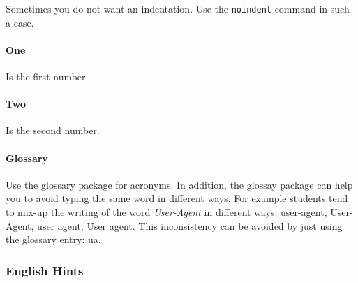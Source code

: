 \noindent Sometimes you do not want an indentation. Use the \texttt{noindent} command in such a case.
\paragraph{One} Is the first number.

\paragraph{Two} Is the second number.

\paragraph{Glossary}
Use the glossary package for acronyms.
In addition, the glossay package can help you to avoid typing the same word in different ways.
For example students tend to mix-up the writing of the word \emph{User-Agent} in different ways: user-agent, User-Agent, user agent, User agent.
This inconsistency can be avoided by just using the glossary entry: \gls{ua}.

\subsubsection{English Hints}

